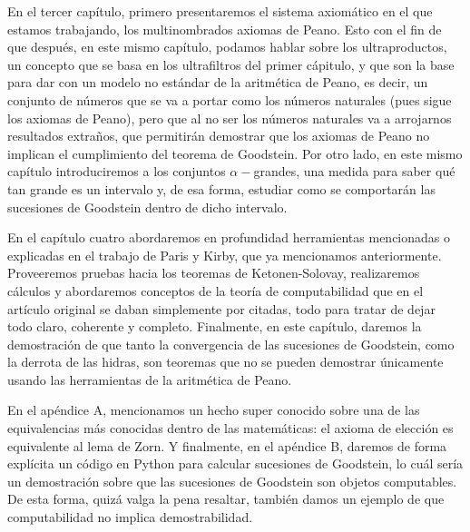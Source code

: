 En el tercer capítulo, primero presentaremos el sistema axiomático en el que estamos trabajando, los multinombrados axiomas de Peano. Esto con el fin de que después, en este mismo capítulo, podamos hablar sobre los ultraproductos, un concepto que se basa en los ultrafiltros del primer cápitulo, y que son la base para dar con un modelo no estándar de la aritmética de Peano, es decir, un conjunto de números que se va a portar como los números naturales (pues sigue los axiomas de Peano), pero que al no ser los números naturales va a arrojarnos resultados extraños, que permitirán demostrar que los axiomas de Peano no implican el cumplimiento del teorema de Goodstein.
Por otro lado, en este mismo capítulo introduciremos a los conjuntos $\alpha-$grandes, una medida para saber qué tan grande es un intervalo y, de esa forma, estudiar como se comportarán las sucesiones de Goodstein dentro de dicho intervalo.

En el capítulo cuatro abordaremos en profundidad herramientas mencionadas o explicadas en el trabajo de Paris y Kirby, que ya mencionamos anteriormente. Proveeremos pruebas hacia los teoremas de Ketonen-Solovay, realizaremos cálculos y abordaremos conceptos de la teoría de computabilidad que en el artículo original se daban simplemente por citadas, todo para tratar de dejar todo claro, coherente y completo.
Finalmente, en este capítulo, daremos la demostración de que tanto la convergencia de las sucesiones de Goodstein, como la derrota de las hidras, son teoremas que no se pueden demostrar únicamente usando las herramientas de la aritmética de Peano.

En el apéndice A, mencionamos un hecho super conocido sobre una de las equivalencias más conocidas dentro de las matemáticas: el axioma de elección es equivalente al lema de Zorn. 
Y finalmente, en el apéndice B, daremos de forma explícita un código en Python para calcular sucesiones de Goodstein, lo cuál sería un demostración sobre que las sucesiones de Goodstein son objetos computables.
De esta forma, quizá valga la pena resaltar, también damos un ejemplo de que computabilidad no implica demostrabilidad.
